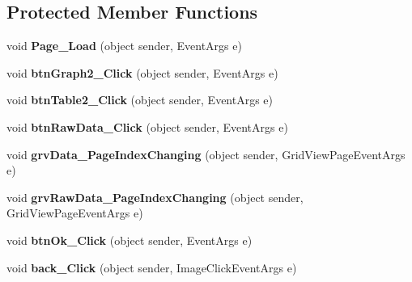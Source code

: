 \subsection*{Protected Member Functions}
\begin{DoxyCompactItemize}
\item 
\hypertarget{classusertrackothers__position_a95456065045c3207ac3e40a9002e0a3b}{void {\bfseries Page\-\_\-\-Load} (object sender, Event\-Args e)}\label{classusertrackothers__position_a95456065045c3207ac3e40a9002e0a3b}

\item 
\hypertarget{classusertrackothers__position_a2d3d186fa73d0958fa7eea31b5e01661}{void {\bfseries btn\-Graph2\-\_\-\-Click} (object sender, Event\-Args e)}\label{classusertrackothers__position_a2d3d186fa73d0958fa7eea31b5e01661}

\item 
\hypertarget{classusertrackothers__position_a7fc7f7638ca6a796d436e31d3144cae6}{void {\bfseries btn\-Table2\-\_\-\-Click} (object sender, Event\-Args e)}\label{classusertrackothers__position_a7fc7f7638ca6a796d436e31d3144cae6}

\item 
\hypertarget{classusertrackothers__position_ade8d6ea20de220418cbc57a4350cbdbb}{void {\bfseries btn\-Raw\-Data\-\_\-\-Click} (object sender, Event\-Args e)}\label{classusertrackothers__position_ade8d6ea20de220418cbc57a4350cbdbb}

\item 
\hypertarget{classusertrackothers__position_a9b2f9a023b47438da9c6b04201dea08b}{void {\bfseries grv\-Data\-\_\-\-Page\-Index\-Changing} (object sender, Grid\-View\-Page\-Event\-Args e)}\label{classusertrackothers__position_a9b2f9a023b47438da9c6b04201dea08b}

\item 
\hypertarget{classusertrackothers__position_a49f63333a354484c756b6a6e58aa3de7}{void {\bfseries grv\-Raw\-Data\-\_\-\-Page\-Index\-Changing} (object sender, Grid\-View\-Page\-Event\-Args e)}\label{classusertrackothers__position_a49f63333a354484c756b6a6e58aa3de7}

\item 
\hypertarget{classusertrackothers__position_a6d7cf6ebdc7d383ff039737098534d4d}{void {\bfseries btn\-Ok\-\_\-\-Click} (object sender, Event\-Args e)}\label{classusertrackothers__position_a6d7cf6ebdc7d383ff039737098534d4d}

\item 
\hypertarget{classusertrackothers__position_a33d359ac36f67e7fa98aea6ff6801c7f}{void {\bfseries back\-\_\-\-Click} (object sender, Image\-Click\-Event\-Args e)}\label{classusertrackothers__position_a33d359ac36f67e7fa98aea6ff6801c7f}


\end{DoxyCompactItemize}
